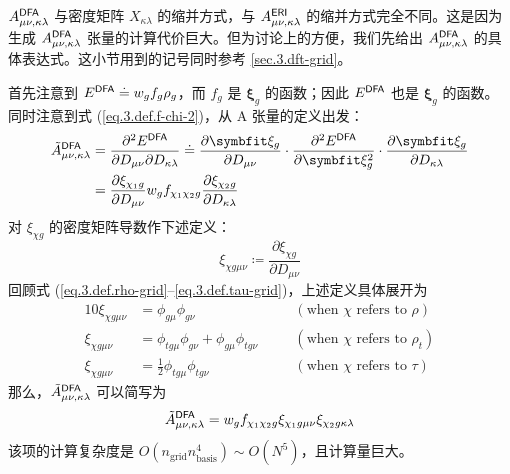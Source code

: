 $A_{\mu \nu, \kappa \lambda}^{\textsf{DFA}}$ 与密度矩阵 $X_{\kappa \lambda}$ 的缩并方式，与 $A_{\mu \nu, \kappa \lambda}^{\textsf{ERI}}$ 的缩并方式完全不同。这是因为生成 $A_{\mu \nu, \kappa \lambda}^{\textsf{DFA}}$ 张量的计算代价巨大。但为讨论上的方便，我们先给出 $A_{\mu \nu, \kappa \lambda}^{\textsf{DFA}}$ 的具体表达式。这小节用到的记号同时参考 \ref{sec.3.dft-grid}。

首先注意到 $E^{\textsf{DFA}} \doteq w_g f_g \rho_g$，而 $f_g$ 是 $\bm{\xi}_g$ 的函数；因此 $E^{\textsf{DFA}}$ 也是 $\bm{\xi}_g$ 的函数。同时注意到式 (\ref{eq.3.def.f-chi-2})，从 A 张量的定义出发：
\begin{align*}
    \tilde{A}_{\mu \nu, \kappa \lambda}^\textmt{DFA}
    &= \frac{\partial^2 E^\textmt{DFA}}{\partial D_{\mu \nu} \partial D_{\kappa \lambda}}
    \doteq \frac{\partial \bm{\xi}_g}{\partial {D_{\mu \nu}}} \cdot \frac{\partial^2 E^\textmt{DFA}}{\partial \bm{\xi}_g^2} \cdot \frac{\partial \bm{\xi}_g}{\partial {D_{\kappa \lambda}}} \\
    &= \frac{\partial \xi_{\chi_1 g}}{\partial {D_{\mu \nu}}} w_g f_{\chi_1 \chi_2 g} \frac{\partial \xi_{\chi_2 g}}{\partial {D_{\kappa \lambda}}}
\end{align*}
对 $\xi_{\chi g}$ 的密度矩阵导数作下述定义：
\begin{equation}
    \label{eq.3.def.xi-deriv-dm}
    \xi_{\chi g \mu \nu} \coloneq \frac{\partial \xi_{\chi g}}{\partial D_{\mu \nu}}
\end{equation}
回顾式 (\ref{eq.3.def.rho-grid}--\ref{eq.3.def.tau-grid})，上述定义具体展开为
\begin{alignat*}{10}
    \xi_{\chi g \mu \nu} &= \phi_{g \mu} \phi_{g \nu} &\quad& (\text{when $\chi$ refers to $\rho$}) \\
    \xi_{\chi g \mu \nu} &= \phi_{t g \mu} \phi_{g \nu} + \phi_{g \mu} \phi_{t g \nu} &\quad& (\text{when $\chi$ refers to $\rho_t$}) \\
    \xi_{\chi g \mu \nu} &= \frac{1}{2} \phi_{t g \mu} \phi_{t g \nu} &\quad& (\text{when $\chi$ refers to $\tau$})
\end{alignat*}
那么，$\tilde{A}_{\mu \nu, \kappa \lambda}^{\textsf{DFA}}$ 可以简写为
\begin{equation}
    \tilde{A}_{\mu \nu, \kappa \lambda}^{\textsf{DFA}} = w_g f_{\chi_1 \chi_2 g} \xi_{\chi_1 g \mu \nu} \xi_{\chi_2 g \kappa \lambda}
\end{equation}
该项的计算复杂度是 $O(n_\mathrm{grid} n_\mathrm{basis}^4) \sim O(N^5)$，且计算量巨大。


